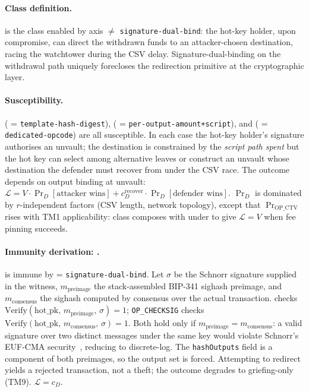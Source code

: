 \paragraph{Class definition.} \classhot{} is the class enabled by
axis \axwdbind{} $\neq$ \texttt{signature-dual-bind}: the hot-key
holder, upon compromise, can direct the withdrawn funds to an
attacker-chosen destination, racing the watchtower during the CSV
delay. Signature-dual-binding on the withdrawal path uniquely
forecloses the redirection primitive at the cryptographic layer.

\paragraph{Susceptibility.} \opctv{} (\axwdbind{} =
\texttt{template-hash-digest}), \opccv{} (\axwdbind{} =
\texttt{per-output-amount+script}), and \opvault{} (\axwdbind{} =
\texttt{dedicated-opcode}) are all susceptible. In each case the
hot-key holder's signature authorises an unvault; the destination is
constrained by the \emph{script path spent} but the hot key can
select among alternative leaves or construct an unvault whose
destination the defender must recover from under the CSV race. The
outcome depends on output binding at unvault:
$\mathcal{L} = V \cdot \Pr_D[\text{attacker wins}] +
c_D^{\text{recover}} \cdot \Pr_D[\text{defender wins}]$.
$\Pr_D$ is dominated by $r$-independent factors (CSV length, network
topology), except that $\Pr_{\mathrm{OP\_CTV}}$ rises with TM1
applicability: class \classfee{} composes with \classhot{} under
\opctv{} to give $\mathcal{L} = V$ when fee pinning succeeds.

\paragraph{Immunity derivation: \catcsfs{}.} \catcsfs{} is immune by
\axwdbind{} = \texttt{signature-dual-bind}. Let $\sigma$ be the
Schnorr signature supplied in the witness, $m_{\text{preimage}}$ the
stack-assembled BIP-341 sighash preimage, and $m_{\text{consensus}}$
the sighash computed by consensus over the actual transaction.
\opcsfs{} checks
$\mathrm{Verify}(\mathrm{hot\_pk},\,m_{\text{preimage}},\,\sigma) = 1$;
\texttt{OP\_CHECKSIG} checks
$\mathrm{Verify}(\mathrm{hot\_pk},\,m_{\text{consensus}},\,\sigma) = 1$.
Both hold only if $m_{\text{preimage}} = m_{\text{consensus}}$: a
valid signature over two distinct messages under the same key would
violate Schnorr's EUF-CMA security~\cite{NRS20}, reducing to
discrete-log. The \texttt{hashOutputs} field is a component of both
preimages, so the output set is forced. Attempting to redirect yields
a rejected transaction, not a theft; the outcome degrades to
griefing-only (TM9). $\mathcal{L} = c_D$.

